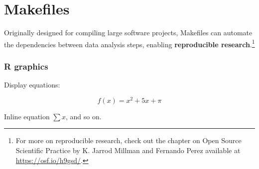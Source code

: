 \documentclass[12pt]{article}
\begin{document}
\section*{Makefiles}

Originally designed for compiling large software projects, Makefiles can automate the dependencies between data analysis steps, enabling \textbf{reproducible research}.\footnote{For more on reproducible research, check out the chapter on Open Source Scientific Practice by K. Jarrod Millman and Fernando Perez available at \url{https://osf.io/h9gsd/}.}

\vspace{0.3in}

\subsubsection*{R graphics}

Display equations:

\[
    f(x) = x^2 + 5x + \pi
\]

Inline equation $\sum x$, and so on.
\end{document}
